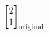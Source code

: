\documentclass[preview]{standalone}
\begin{document}
\begin{align*}
\begin{bmatrix}2\\1\end{bmatrix}_{\rm original}
\end{align*}
\end{document}
